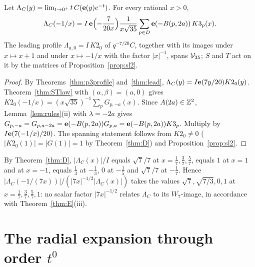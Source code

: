 \begin{theorem}\label{thm:SlawC}
Let $\Lambda_C(y)=\lim_{t\to0^+}t\,C(\mathbf{e}(y)e^{-t})$. For every rational $x>0$,
\[
\Lambda_C(-1/x)=I\,\mathbf{e}\Bigl(-\frac7{20x}\Bigr)\frac1{x\sqrt{35}}\sum_{p\in D}\mathbf{e}(-B(p,2a))\,K3_p(x).
\]
The leading profile $\Lambda_{a,0}=I\,K2_0$ of $q^{-7/20}C$, together with its images under $x\mapsto x+1$ and under $x\mapsto-1/x$ with the factor $|x|^{-1}$,
spans $\mathcal V_{35}$; $S$ and $T$ act on it by the matrices of Proposition~\ref{prop:sl2}.
\end{theorem}
\begin{proof}
By Theorems~\ref{thm:p3profile} and~\ref{thm:lead}, $\Lambda_C(y)=I\mathbf{e}(7y/20)K2_0(y)$. Theorem~\ref{thm:STlaw} with $(\alpha,\beta)=(a,0)$ gives
$K2_0(-1/x)=(x\sqrt{35})^{-1}\sum_pG_{p,-a}(x)$. Since $A(2a)\in\mathbb{Z}^2$, Lemma~\ref{lem:rules}(ii) with $\lambda=-2a$ gives
$G_{p,-a}=G_{p,a-2a}=\mathbf{e}(-B(p,2a))G_{p,a}=\mathbf{e}(-B(p,2a))K3_p$. Multiply by $I\mathbf{e}(7(-1/x)/20)$. The spanning statement follows from
$K2_0\ne0$ ($|K2_0(1)|=|G(1)|=1$ by Theorem~\ref{thm:D}) and Proposition~\ref{prop:sl2}.
\end{proof}
\begin{remark}\label{rem:mapC}
By Theorem~\ref{thm:D}, $|\Lambda_C(x)|/I$ equals $\sqrt7/7$ at $x=\tfrac17,\tfrac37,\tfrac57$, equals $1$ at $x=1$ and at $x=-1$, equals $\tfrac13$ at $-\tfrac13$, $0$ at $-\tfrac15$
and $\sqrt7/7$ at $-\tfrac17$. Hence $|\Lambda_C(-1/(7x))|/(|7x|^{-1/2}|\Lambda_C(x)|)$ takes the values $\sqrt7,\sqrt{7/3},0,1$ at $x=\tfrac17,\tfrac37,\tfrac57,1$:
no scalar factor $|7x|^{-1/2}$ relates $\Lambda_C$ to its $W_7$-image, in accordance with Theorem~\ref{thm:E}(iii).
\end{remark}

\section{The radial expansion through order $t^0$}\label{sec:expansion}
